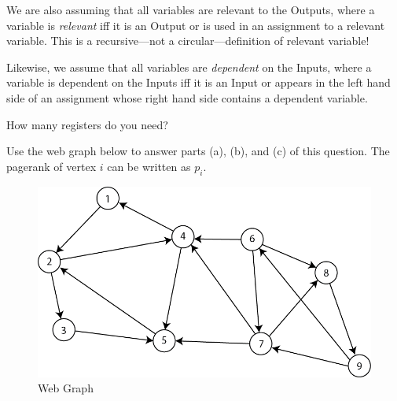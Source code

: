\documentclass[12pt,twoside]{article}
\begin{document}
\begin{problem}{10}
{  We are also assuming that all variables are relevant to the Outputs,
  where a variable is \emph{relevant} iff it
  is an Output or is used in an assignment to a relevant variable.
  This is a recursive---not a circular---definition of relevant
  variable!

  Likewise, we assume that all variables are \emph{dependent} on the Inputs, where a variable is
  dependent on the Inputs iff it is an Input or appears in the left
  hand side of an assignment whose right hand side contains a
  dependent variable.
}

 How many registers
do you need?




\newpage



\begin{problem}{10} 
Use the web graph below to answer parts (a), (b), and (c) of this question. The pagerank of vertex $i$ can be written as $p_i$. 

\begin{figure}[!ht]
\begin{center}
\includegraphics[width=12cm]{pagerank.png}\end{center}
\caption{Web Graph}
\end{figure}



\end{problem}
\end{problem}
\end{document}
